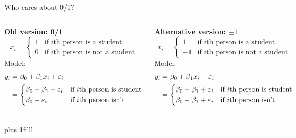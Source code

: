 \documentclass[aspectratio=169,usenames,dvipsnames]{beamer}
\newcommand{\InstructorNotes}[1]{\textit{\color{orange}#1}}
\renewcommand{\InstructorNotes}[1]{}
\newcommand{\bvfill}{\vskip0pt plus 1filll}
\begin{document}
	\begin{frame}[t]{Who cares about 0/1?}
	
	\begin{columns}
		\textbf{Old version: 0/1}
	\begin{equation*}
			x_i =
		\begin{cases}
			1 & \text{if $i$th person is a student}\\
			0 & \text{if $i$th person is not a student}
		\end{cases}
	\end{equation*}
	Model:
	\begin{align*}
	y_i &= \beta_0 + \beta_1x_i+\varepsilon_i\\
	&= 
		\begin{cases}
			\beta_0 + \beta_1+\varepsilon_i	 & \text{if $i$th person is student}\\
			\beta_0 +\varepsilon_i & \text{if $i$th person isn't}
		\end{cases}
	\end{align*}
	
	\textbf{Alternative version: $\pm 1$}
	\begin{equation*}
			x_i =
		\begin{cases}
			1 & \text{if $i$th person is a student}\\
			-1 & \text{if $i$th person is not a student}
		\end{cases}
	\end{equation*}
	Model:
	\begin{align*}
	y_i &= \beta_0 + \beta_1x_i+\varepsilon_i\\
	&= 
		\begin{cases}
			\beta_0 + \beta_1+\varepsilon_i	 & \text{if $i$th person is student}\\
			\beta_0 - \beta_1+\varepsilon_i & \text{if $i$th person isn't}
		\end{cases}
	\end{align*}
	
	\end{columns}
	
	\bvfill
	\InstructorNotes{Note that the predictions will be the same}
	\end{frame}
	
\end{document}
